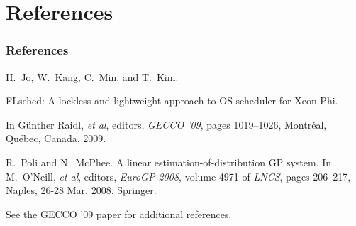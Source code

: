 \documentclass{beamer}
\newcommand{\linespace}{\vskip 0.25cm}
\begin{document}
\section*{References}

\begin{frame} 
\frametitle{References} 

\begin{thebibliography}{lskdjf}

H.~Jo, W.~Kang, C.~Min, and T.~Kim.

\newblock FLsched: A lockless and lightweight approach to OS scheduler for Xeon Phi.

\newblock In G\"unther Raidl, \emph{et al}, editors, {\em GECCO '09}, pages 1019--1026, Montr\'eal, Qu\'ebec, Canada, 2009.

R.~Poli and N.~McPhee.
\newblock A linear estimation-of-distribution {GP} system.
\newblock In M.~O'Neill, \emph{et al}, editors, {\em EuroGP 2008}, volume
  4971 of {\em LNCS}, pages 206--217, Naples,
  26-28 Mar. 2008. Springer.
  
\end{thebibliography}

\linespace
\begin{center}
	See the GECCO '09 paper for additional references.
	\end{center}
\end{frame} 
\end{document}
